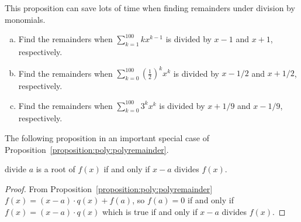 This proposition can save lots of time when finding remainders under division by monomials.

\begin{exercise}{}
\begin{enumerate}[(a)]
\item
Find the remainders when $\sum_{k=1}^{100} k x^{k-1}$ is divided by $x-1$ and  $x+1$, respectively.
\item
Find the remainders when $\sum_{k=0}^{100} \left( \frac{1}{2} \right)^k x^k$ is divided by $x-1/2$ and $x+1/2$, respectively.
\item
Find the remainders when $\sum_{k=0}^{100} 3^k x^{k}$ is divided by $x+1/9$ and $x - 1/9$, respectively.
\end{enumerate}
\end{exercise}

The following proposition in an important special case of Proposition~\ref{proposition:poly:polyremainder}.

\begin {prop}{divide}
$a$ is a root of $f(x)$ if and only if $x-a$ divides $f(x)$.
\end {prop}

\begin{proof}
From Proposition~\ref{proposition:poly:polyremainder} $f(x) = (x-a) \cdot q(x) + f(a)$, so $f(a) = 0$ if and only if $f(x)=(x-a) \cdot q(x)$ which is true if and only if $x-a$ divides $f(x)$.
\end{proof}


